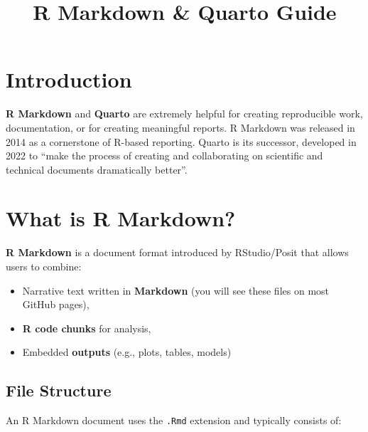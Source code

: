 \documentclass[
  letterpaper,
  DIV=11,
  numbers=noendperiod]{scrartcl}
\title{R Markdown \& Quarto Guide}
\author{}
\date{}
\providecommand{\tightlist}{%
  \setlength{\itemsep}{0pt}\setlength{\parskip}{0pt}}\usepackage{longtable,booktabs,array}
\renewcommand*\contentsname{Table of contents}
\newcommand\contentsname{Table of contents}
\begin{document}
\maketitle
\ifdefined\Shaded\renewenvironment{Shaded}{\begin{tcolorbox}[breakable, interior hidden, borderline west={3pt}{0pt}{shadecolor}, frame hidden, boxrule=0pt, sharp corners, enhanced]}{\end{tcolorbox}}\fi

\renewcommand*\contentsname{Table of contents}
{
\hypersetup{linkcolor=}
\setcounter{tocdepth}{3}
\tableofcontents
}
\hypertarget{introduction}{%
\section{Introduction}\label{introduction}}

\textbf{R Markdown} and \textbf{Quarto} are extremely helpful for
creating reproducible work, documentation, or for creating meaningful
reports. R Markdown was released in 2014 as a cornerstone of R-based
reporting. Quarto is its successor, developed in 2022 to ``make the
process of creating and collaborating on scientific and technical
documents dramatically better''.

\hypertarget{what-is-r-markdown}{%
\section{What is R Markdown?}\label{what-is-r-markdown}}

\textbf{R Markdown} is a document format introduced by RStudio/Posit
that allows users to combine:

\begin{itemize}
\tightlist
\item
  Narrative text written in \textbf{Markdown} (you will see these files
  on most GitHub pages),
\item
  \textbf{R code chunks} for analysis,
\item
  Embedded \textbf{outputs} (e.g., plots, tables, models)
\end{itemize}

\hypertarget{file-structure}{%
\subsection{File Structure}\label{file-structure}}

An R Markdown document uses the \texttt{.Rmd} extension and typically
consists of:
\end{document}
